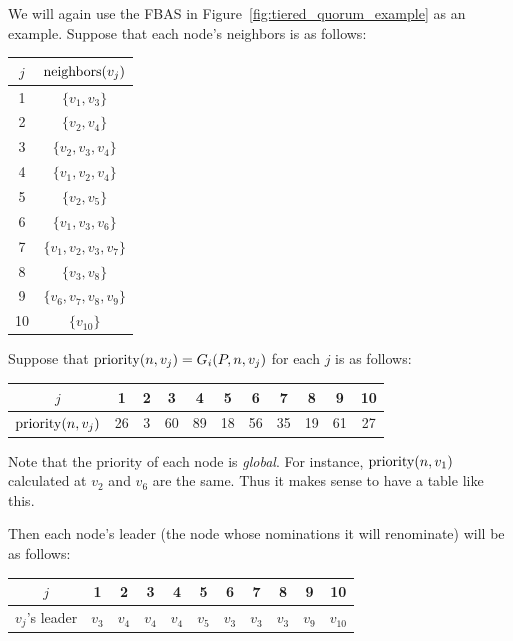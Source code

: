 \begin{exmp}
    We will again use the FBAS in Figure~\ref{fig:tiered_quorum_example} as an example.
    Suppose that each node's neighbors is as follows:
    \begin{center}
      \begin{tabular}{ | c | c | }
        \hline
            $j$ & $\operatorname{neighbors}(v_j)$ \\ \hline
            1 & $\{ v_1, v_3 \}$ \\ \hline
            2 & $\{ v_2, v_4 \}$ \\ \hline
            3 & $\{ v_2, v_3, v_4 \}$ \\ \hline
            4 & $\{ v_1, v_2, v_4 \}$ \\ \hline
            5 & $\{ v_2, v_5 \}$ \\ \hline
            6 & $\{ v_1, v_3, v_6\}$ \\ \hline
            7 & $\{ v_1, v_2, v_3, v_7 \}$ \\ \hline
            8 & $\{ v_3, v_8 \}$ \\ \hline
            9 & $\{ v_6, v_7, v_8, v_9 \}$ \\ \hline
            10 & $\{ v_{10} \}$ \\
        \hline
      \end{tabular}
    \end{center}
    Suppose that $\operatorname{priority}(n, v_j) = G_i(P, n, v_j)$ for each $j$ is as follows:
    \begin{center}
      \begin{tabular}{ | c | c | c | c | c | c | c | c | c | c | c | }
        \hline
            $j$ & 1 & 2 & 3 & 4 & 5 & 6 & 7 & 8 & 9 & 10 \\ \hline
            $\operatorname{priority}(n, v_j)$ &  26 & 3 & 60 & 89 & 18 & 56 & 35 & 19 & 61 & 27\\
        \hline
      \end{tabular}
    \end{center}
    Note that the priority of each node is \textit{global}.
    For instance, $\operatorname{priority}(n, v_1)$ calculated at $v_2$ and $v_6$ are the same.
    Thus it makes sense to have a table like this.

    Then each node's leader (the node whose nominations it will renominate) will be as follows:
    \begin{center}
      \begin{tabular}{ | c | c | c | c | c | c | c | c | c | c | c | }
        \hline
            $j$ & 1 & 2 & 3 & 4 & 5 & 6 & 7 & 8 & 9 & 10 \\ \hline
            $v_j$'s leader & $v_3$ & $v_4$ & $v_4$ & $v_4$ & $v_5$ & $v_3$ & $v_3$ & $v_3$ & $v_9$ & $v_{10}$ \\
        \hline
      \end{tabular}
    \end{center}


\end{exmp}
